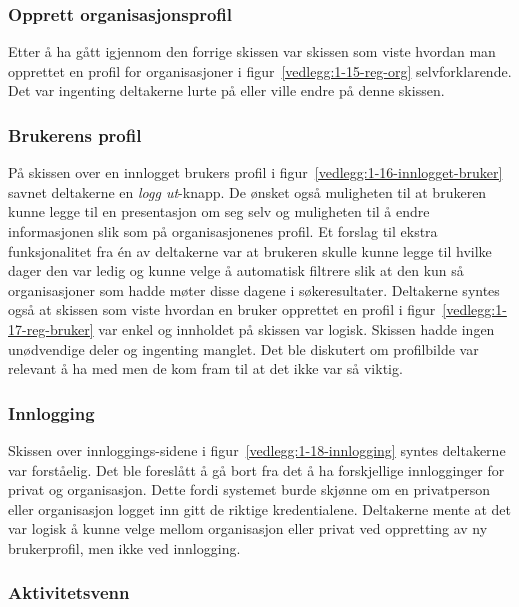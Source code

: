 \subsubsection{Opprett organisasjonsprofil}

Etter å ha gått igjennom den forrige skissen var skissen som viste hvordan man opprettet en profil for organisasjoner i figur~\ref{vedlegg:1-15-reg-org} selvforklarende. Det var ingenting deltakerne lurte på eller ville endre på denne skissen.

\subsubsection{Brukerens profil}

På skissen over en innlogget brukers profil i figur~\ref{vedlegg:1-16-innlogget-bruker} savnet deltakerne en {\em  logg ut}-knapp. De ønsket også muligheten til at brukeren kunne legge til en presentasjon om seg selv og muligheten til å endre informasjonen slik som på organisasjonenes profil. Et forslag til ekstra funksjonalitet fra én av deltakerne var at brukeren skulle kunne legge til hvilke dager den var ledig og kunne velge å automatisk filtrere slik at den kun så organisasjoner som hadde møter disse dagene i søkeresultater.
Deltakerne syntes også at skissen som viste hvordan en bruker opprettet en profil i figur~\ref{vedlegg:1-17-reg-bruker} var enkel og innholdet på skissen var logisk. Skissen hadde ingen unødvendige deler og ingenting manglet. Det ble diskutert om profilbilde var relevant å ha med men de kom fram til at det ikke var så viktig. 


\subsubsection{Innlogging}

Skissen over innloggings-sidene i figur~\ref{vedlegg:1-18-innlogging} syntes deltakerne var forståelig. Det ble foreslått å gå bort fra det å ha forskjellige innlogginger for privat og organisasjon. Dette fordi systemet burde skjønne om en privatperson eller organisasjon logget inn gitt de riktige kredentialene. Deltakerne mente at det var logisk å kunne velge mellom organisasjon eller privat ved oppretting av ny brukerprofil, men ikke ved innlogging.


\subsubsection{Aktivitetsvenn}

